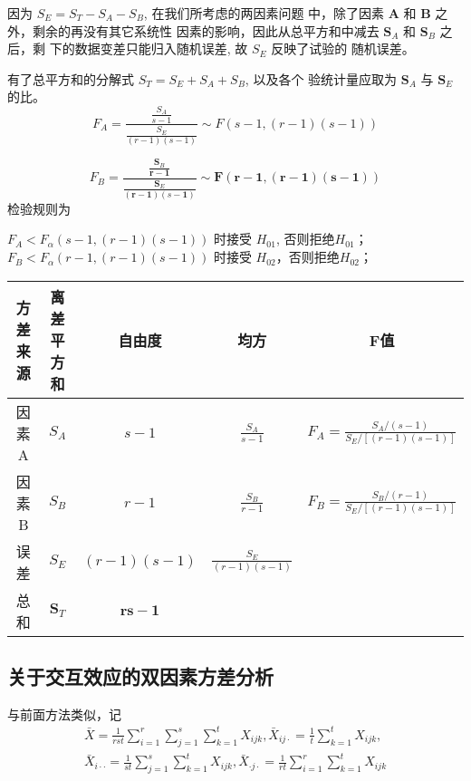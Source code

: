 因为 \( S_{E}=S_{T}-S_{A}-S_{B} \), 在我们所考虑的两因素问题 中，除了因素 \( \boldsymbol{A} \) 和 \( \boldsymbol{B} \) 之外，剩余的再没有其它系统性 因素的影响，因此从总平方和中减去 \( \boldsymbol{S}_{A} \) 和 \( \boldsymbol{S}_{B} \) 之后，剩 下的数据变差只能归入随机误差, 故 \( S_{E} \) 反映了试验的 随机误差。

有了总平方和的分解式 \( S_{T}=S_{E}+S_{A}+S_{B} \), 以及各个
验统计量应取为 \( \boldsymbol{S}_{A} \) 与 \( \boldsymbol{S}_{E} \) 的比。
$$
F_{A}=\frac{\frac{S_{A}}{s-1}}{\frac{S_{E}}{(r-1)(s-1)}} \sim F(s-1,(r-1)(s-1))
$$

$$
F_{B}=\frac{\frac{\boldsymbol{S}_{B}}{\boldsymbol{r}-\mathbf{1}}}{\frac{\boldsymbol{S}_{E}}{(\boldsymbol{r}-\mathbf{1})(s-\mathbf{1})}} \sim \boldsymbol{F}(\boldsymbol{r}-\mathbf{1},(\boldsymbol{r}-\mathbf{1})(\boldsymbol{s}-\mathbf{1}))
$$
检验规则为

\( F_{A}<F_{\alpha}(s-1,(r-1)(s-1)) \) 时接受 \( H_{01} \), 否则拒绝\( H_{01} \)；
\( F_{B}<F_{\alpha}(r-1,(r-1)(s-1)) \) 时接受 \( H_{02} \)，否则拒绝\( H_{02} \)；

\begin{table}
   \begin{tabular}{c|c|c|c|c}
    \hline
            方差来源 & 离差平方和 & 自由度 & 均方 & F值 \\
    \hline 因素 A & \( S_{A} \) & \( s-1 \) & \( \frac{S_{A}}{s-1} \) & \( F_{A}=\frac{S_{A} /(s-1)}{S_{E} /[(r-1)(s-1)]} \) \\
    \hline  因素 B & \( S_{B} \) & \( r-1 \) & \( \frac{S_{B}}{r-1} \) & \( F_{B}=\frac{S_{B} /(r-1)}{S_{E} /[(r-1)(s-1)]} \) \\
    \hline 误 差 & \( S_{E} \) & \( (r-1)(s-1) \) & \( \frac{S_{E}}{(r-1)(s-1)} \) & \\
    \hline 总 和 & \( \boldsymbol{S}_{T} \) & \( \boldsymbol{r s}-\mathbf{1} \) & & \\
    \hline
    \end{tabular} 
\end{table}

\subsection{关于交互效应的双因素方差分析}

与前面方法类似，记
$$
\begin{array}{l}
\bar{X}=\frac{1}{r s t} \sum_{i=1}^{r} \sum_{j=1}^{s} \sum_{k=1}^{t} X_{i j k}, \bar{X}_{i j \cdot}=\frac{1}{t} \sum_{k=1}^{t} X_{i j k}, \\
\bar{X}_{i \cdot \cdot}=\frac{1}{s t} \sum_{j=1}^{s} \sum_{k=1}^{t} X_{i j k}, \bar{X}_{\cdot j \cdot}=\frac{1}{r t} \sum_{i=1}^{r} \sum_{k=1}^{t} X_{i j k}
\end{array}
$$

